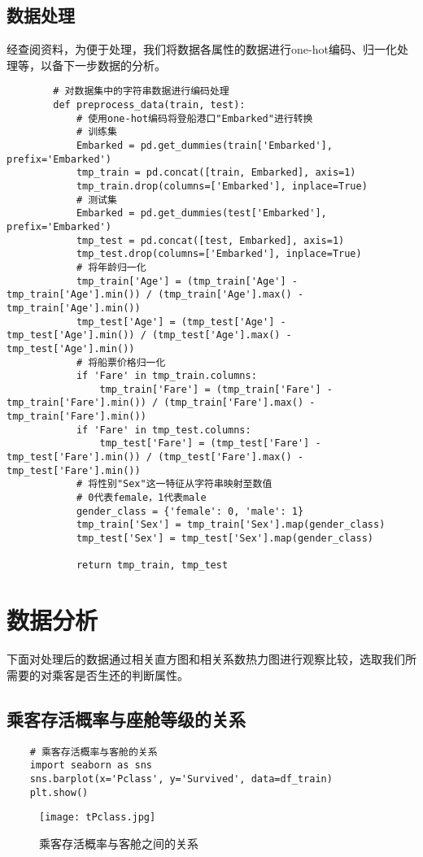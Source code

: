 \documentclass[AutoFakeBold]{LZUThesis}
\begin{document}
    \section{数据处理}
    经查阅资料，为便于处理，我们将数据各属性的数据进行one-hot编码、归一化处理等，以备下一步数据的分析。
    \begin{lstlisting}
        # 对数据集中的字符串数据进行编码处理
        def preprocess_data(train, test):
            # 使用one-hot编码将登船港口"Embarked"进行转换
            # 训练集
            Embarked = pd.get_dummies(train['Embarked'], prefix='Embarked')
            tmp_train = pd.concat([train, Embarked], axis=1)
            tmp_train.drop(columns=['Embarked'], inplace=True)
            # 测试集
            Embarked = pd.get_dummies(test['Embarked'], prefix='Embarked')
            tmp_test = pd.concat([test, Embarked], axis=1)
            tmp_test.drop(columns=['Embarked'], inplace=True)
            # 将年龄归一化
            tmp_train['Age'] = (tmp_train['Age'] - tmp_train['Age'].min()) / (tmp_train['Age'].max() - tmp_train['Age'].min())
            tmp_test['Age'] = (tmp_test['Age'] - tmp_test['Age'].min()) / (tmp_test['Age'].max() - tmp_test['Age'].min())
            # 将船票价格归一化
            if 'Fare' in tmp_train.columns:
                tmp_train['Fare'] = (tmp_train['Fare'] - tmp_train['Fare'].min()) / (tmp_train['Fare'].max() - tmp_train['Fare'].min())
            if 'Fare' in tmp_test.columns:
                tmp_test['Fare'] = (tmp_test['Fare'] - tmp_test['Fare'].min()) / (tmp_test['Fare'].max() - tmp_test['Fare'].min())
            # 将性别"Sex"这一特征从字符串映射至数值
            # 0代表female，1代表male
            gender_class = {'female': 0, 'male': 1}
            tmp_train['Sex'] = tmp_train['Sex'].map(gender_class)
            tmp_test['Sex'] = tmp_test['Sex'].map(gender_class)
            
            return tmp_train, tmp_test        
    \end{lstlisting}
\chapter{数据分析}
下面对处理后的数据通过相关直方图和相关系数热力图进行观察比较，选取我们所需要的对乘客是否生还的判断属性。
\section{乘客存活概率与座舱等级的关系}
\begin{lstlisting}
    # 乘客存活概率与客舱的关系
    import seaborn as sns
    sns.barplot(x='Pclass', y='Survived', data=df_train)
    plt.show()
\end{lstlisting}
\begin{figure}[htbp]
    \centering
    \texttt{[image: tPclass.jpg]}
    \caption{乘客存活概率与客舱之间的关系}
\end{figure}
\end{document}
